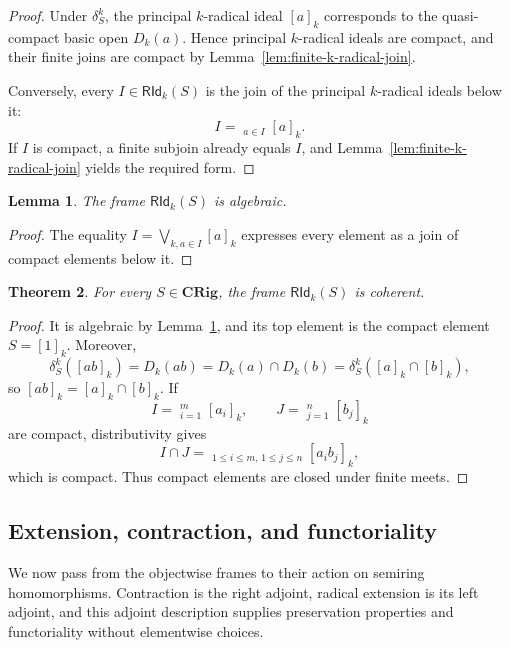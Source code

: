 \documentclass[12pt,leqno]{amsart}
\newcommand{\CRig}{\mathbf{CRig}}
\newcommand{\RIdk}{\mathsf{RId}_{k}}
\newtheorem{theorem}{Theorem}[section]
\newtheorem{lemma}[theorem]{Lemma}
\theoremstyle{definition}
\numberwithin{equation}{section}
\theoremstyle{remark}
\def\leq{\leqslant}
\begin{document}
\begin{proof}
Under \(\delta^k_S\), the principal $k$-radical ideal \([a]_k\) corresponds to the quasi-compact basic open \(D_k(a)\). Hence principal $k$-radical ideals are compact, and their finite joins are compact by Lemma~\ref{lem:finite-k-radical-join}.

Conversely, every \(I\in\RIdk(S)\) is the join of the principal $k$-radical ideals below it:
\[
I=\mathop{\bigvee_{\!k}}_{a\in I}[a]_k.
\]
If $I$ is compact, a finite subjoin already equals $I$, and Lemma~\ref{lem:finite-k-radical-join} yields the required form.
\end{proof}

\begin{lemma}\label{lem:k-radical-algebraic}
The frame \(\RIdk(S)\) is algebraic.
\end{lemma}

\begin{proof}
The equality \(I=\bigvee_{\!k,a\in I}[a]_k\) expresses every element as a join of compact elements below it.
\end{proof}

\begin{theorem}\label{thm:k-radical-coherent}
For every \(S\in\CRig\), the frame \(\RIdk(S)\) is coherent.
\end{theorem}

\begin{proof}
It is algebraic by Lemma~\ref{lem:k-radical-algebraic}, and its top element is the compact element \(S=[1]_k\). Moreover,
\[
\delta^k_S([ab]_k)=D_k(ab)=D_k(a)\cap D_k(b)
 =\delta^k_S([a]_k\cap[b]_k),
\]
so \([ab]_k=[a]_k\cap[b]_k\). If
\[
I=\mathop{\bigvee_{\!k}}_{i=1}^{m}[a_i]_k,
\qquad
J=\mathop{\bigvee_{\!k}}_{j=1}^{n}[b_j]_k
\]
are compact, distributivity gives
\[
I\cap J
 =\mathop{\bigvee_{\!k}}_{1\leq i\leq m,\,1\leq j\leq n}
  [a_i b_j]_k,
\]
which is compact. Thus compact elements are closed under finite meets.
\end{proof}

\subsection{Extension, contraction, and functoriality}

We now pass from the objectwise frames to their action on semiring homomorphisms. Contraction is the right adjoint, radical extension is its left adjoint, and this adjoint description supplies preservation properties and functoriality without elementwise choices.
\end{document}
